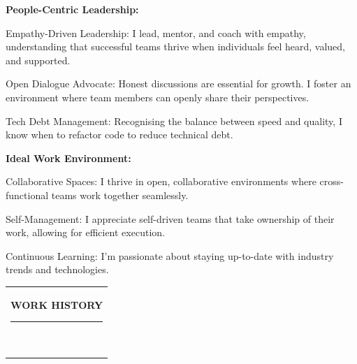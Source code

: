 \documentclass[11pt,A4]{article}
\newcommand{\mpwidth}{\linewidth-\fboxsep-\fboxsep}
\newcommand{\cvlist}[1] {
    \begin{itemize}[itemsep=3pt,topsep=10pt]{#1}\end{itemize}
}
\newcommand{\cvtext}[1] {
    \begin{tabular*}{1\mpwidth}{p{0.98\mpwidth}}
        \parbox{1\mpwidth}{#1}
    \end{tabular*}
}
\newcommand{\cvsection}[1] {
    \vspace{14pt}
    \cvtext{
        \textbf{\LARGE{\textcolor{darkcol}{\uppercase{#1}}}}\\[-4pt]
        \textcolor{maincol}{ \rule{0.1\textwidth}{2pt} } \\
    }
}
\begin{document}
\begin{paracol}{2}
\begin{rightcolumn}
{            \textbf{People-Centric Leadership:}
            \cvlist{
                \item Empathy-Driven Leadership: I lead, mentor, and coach with empathy, understanding that successful teams thrive when individuals feel heard, valued, and supported.
                \item Open Dialogue Advocate: Honest discussions are essential for growth. I foster an environment where team members can openly share their perspectives.
                \item Tech Debt Management: Recognising the balance between speed and quality, I know when to refactor code to reduce technical debt.
            }

            \textbf{Ideal Work Environment:}
            \cvlist{
                \item Collaborative Spaces: I thrive in open, collaborative environments where cross-functional teams work together seamlessly.
                \item Self-Management: I appreciate self-driven teams that take ownership of their work, allowing for efficient execution.
                \item Continuous Learning: I’m passionate about staying up-to-date with industry trends and technologies.
            }
            }

            \vfill\null
            \cvsection{WORK HISTORY}


\end{rightcolumn}
\end{paracol}
\end{document}
